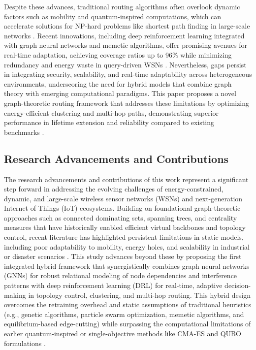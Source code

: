 \documentclass[a4paper,fleqn]{cas-dc}
\numberwithin{equation}{section}
\begin{document}
Despite these advances, traditional routing algorithms often overlook dynamic factors such as mobility and quantum-inspired computations, which can accelerate solutions for NP-hard problems like shortest path finding in large-scale networks \cite{r12,r30}. Recent innovations, including deep reinforcement learning integrated with graph neural networks and memetic algorithms, offer promising avenues for real-time adaptation, achieving coverage ratios up to 96\% while minimizing redundancy and energy waste in query-driven WSNs \cite{r2,r11}. Nevertheless, gaps persist in integrating security, scalability, and real-time adaptability across heterogeneous environments, underscoring the need for hybrid models that combine graph theory with emerging computational paradigms. This paper proposes a novel graph-theoretic routing framework that addresses these limitations by optimizing energy-efficient clustering and multi-hop paths, demonstrating superior performance in lifetime extension and reliability compared to existing benchmarks \cite{r9,r14}.

\subsection{Research Advancements and Contributions}

\begin{sloppypar}
The research advancements and contributions of this work represent a significant step forward in addressing the evolving challenges of energy-constrained, dynamic, and large-scale wireless sensor networks (WSNs) and next-generation Internet of Things (IoT) ecosystems. Building on foundational graph-theoretic approaches such as connected dominating sets, spanning trees, and centrality measures that have historically enabled efficient virtual backbones and topology control, recent literature has highlighted persistent limitations in static models, including poor adaptability to mobility, energy holes, and scalability in industrial or disaster scenarios \cite{r6,r29}. This study advances beyond these by proposing the first integrated hybrid framework that synergistically combines graph neural networks (GNNs) for robust relational modeling of node dependencies and interference patterns with deep reinforcement learning (DRL) for real-time, adaptive decision-making in topology control, clustering, and multi-hop routing. This hybrid design overcomes the retraining overhead and static assumptions of traditional heuristics (e.g., genetic algorithms, particle swarm optimization, memetic algorithms, and equilibrium-based edge-cutting) while surpassing the computational limitations of earlier quantum-inspired or single-objective methods like CMA-ES and QUBO formulations \cite{r11,r12}.
\end{sloppypar}
\end{document}
